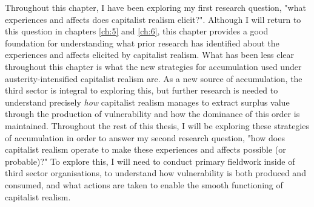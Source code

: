 Throughout this chapter, I have been exploring my first research question, "what experiences and affects does capitalist realism elicit?". Although I will return to this question in chapters \ref{ch:5} and \ref{ch:6}, this chapter provides a good foundation for understanding what prior research has identified about the experiences and affects elicited by capitalist realism. What has been less clear throughout this chapter is what the new strategies for accumulation used under austerity-intensified capitalist realism are. As a new source of accumulation, the third sector is integral to exploring this, but further research is needed to understand precisely \emph{how} capitalist realism manages to extract surplus value through the production of vulnerability and how the dominance of this order is maintained. Throughout the rest of this thesis, I will be exploring these strategies of accumulation in order to answer my second research question, "how does capitalist realism operate to make these experiences and affects possible (or probable)?" To explore this, I will need to conduct primary fieldwork inside of third sector organisations, to understand how vulnerability is both produced and consumed, and what actions are taken to enable the smooth functioning of capitalist realism.